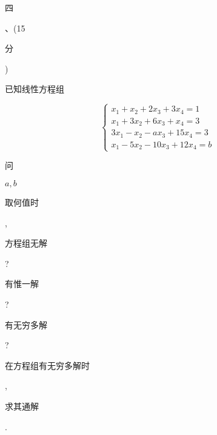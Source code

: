 \documentclass[10pt]{article}
\begin{document}
\begin{CJK}{UTF8}{mj}四\end{CJK}、(15 \begin{CJK}{UTF8}{mj}分\end{CJK}) \begin{CJK}{UTF8}{mj}已知线性方程组\end{CJK}
$$
\left\{\begin{array}{l}
x_{1}+x_{2}+2 x_{3}+3 x_{4}=1 \\
x_{1}+3 x_{2}+6 x_{3}+x_{4}=3 \\
3 x_{1}-x_{2}-a x_{3}+15 x_{4}=3 \\
x_{1}-5 x_{2}-10 x_{3}+12 x_{4}=b
\end{array}\right.
$$
\begin{CJK}{UTF8}{mj}问\end{CJK} $a, b$ \begin{CJK}{UTF8}{mj}取何值时\end{CJK}, \begin{CJK}{UTF8}{mj}方程组无解\end{CJK}? \begin{CJK}{UTF8}{mj}有惟一解\end{CJK}? \begin{CJK}{UTF8}{mj}有无穷多解\end{CJK}? \begin{CJK}{UTF8}{mj}在方程组有无穷多解时\end{CJK}, \begin{CJK}{UTF8}{mj}求其通解\end{CJK}.
\end{document}
